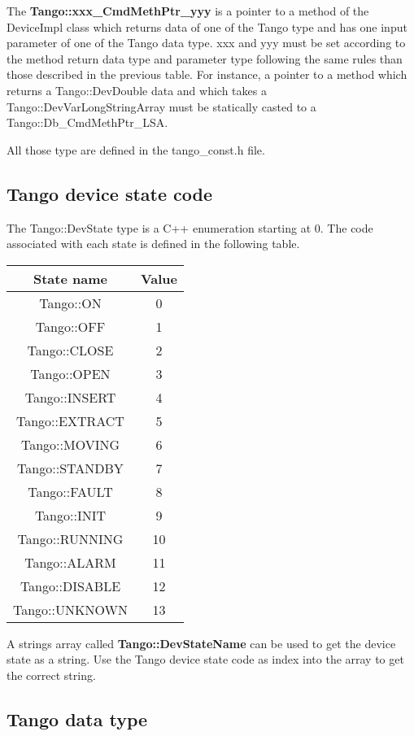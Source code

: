 The \textbf{Tango::xxx\_CmdMethPtr\_yyy} is a pointer to a method
of the DeviceImpl class which returns data of one of the Tango type
and has one input parameter of one of the Tango data type. xxx and
yyy must be set according to the method return data type and parameter
type following the same rules than those described in the previous
table. For instance, a pointer to a method which returns a Tango::DevDouble
data and which takes a Tango::DevVarLongStringArray must be statically
casted to a Tango::Db\_CmdMethPtr\_LSA.

All those type are defined in the tango\_const.h file.

\subsection{Tango device state code}

The Tango::DevState type is a C++ enumeration starting at 0. The code
associated with each state is defined in the following
table.

\vspace{0.3cm}

\begin{center}
\begin{longtable}{|c|c|}
\hline 
State name & Value\tabularnewline
\hline 
\hline 
Tango::ON & 0\tabularnewline
\hline 
Tango::OFF & 1\tabularnewline
\hline 
Tango::CLOSE & 2\tabularnewline
\hline 
Tango::OPEN & 3\tabularnewline
\hline 
Tango::INSERT & 4\tabularnewline
\hline 
Tango::EXTRACT & 5\tabularnewline
\hline 
Tango::MOVING & 6\tabularnewline
\hline 
Tango::STANDBY & 7\tabularnewline
\hline 
Tango::FAULT & 8\tabularnewline
\hline 
Tango::INIT & 9\tabularnewline
\hline 
Tango::RUNNING & 10\tabularnewline
\hline 
Tango::ALARM & 11\tabularnewline
\hline 
Tango::DISABLE & 12\tabularnewline
\hline 
Tango::UNKNOWN & 13\tabularnewline
\hline 
\end{longtable}
\par\end{center}

\vspace{0.3cm}

A strings array called \textbf{Tango::DevStateName}
can be used to get the device state as a string. Use the Tango device
state code as index into the array to get the correct string.

\subsection{Tango data type }


